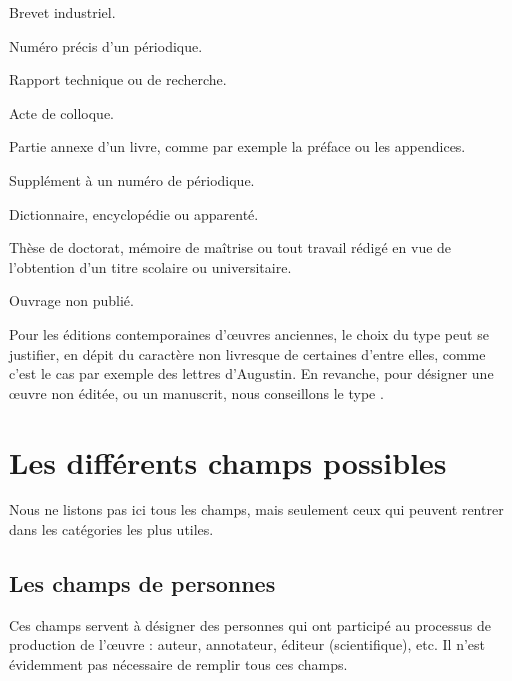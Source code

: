 \begin{choix}
	\item[\type{patent}]
	Brevet industriel.
	\item[\type{periodical}]
	Numéro précis d'un périodique.	
	\item[\type{report}]	
	Rapport technique ou de recherche.
	\item[\type{proceedings}]
	Acte de colloque.
	\item[\type{suppbook}]
	Partie annexe d'un livre, comme par exemple la préface ou les appendices.
	\item[\type{supperiodical}]
	Supplément à un numéro de périodique.
	\item[\type{reference}]
	Dictionnaire, encyclopédie ou apparenté.
	\item[\type{thesis}]
	Thèse de doctorat, mémoire de maîtrise ou tout travail rédigé en vue de l'obtention d'un titre scolaire ou universitaire.
	\item[\type{unpublished}]
	Ouvrage non publié.
\end{choix}

Pour les éditions contemporaines d'œuvres anciennes, le choix du type  peut se justifier, en dépit du caractère non livresque de certaines d'entre elles, comme c'est le cas par exemple des lettres d'Augustin. En revanche, pour désigner  une œuvre non éditée, ou un manuscrit, nous conseillons le type .

\section{Les différents champs possibles}

Nous ne listons pas ici tous les champs, mais seulement ceux qui peuvent rentrer dans les catégories les plus utiles.
\subsection{Les champs de personnes}

Ces champs servent à désigner des personnes qui ont participé au processus de production de l'œuvre : auteur, annotateur, éditeur (scientifique), etc. Il n'est évidemment pas nécessaire de remplir tous ces champs.

